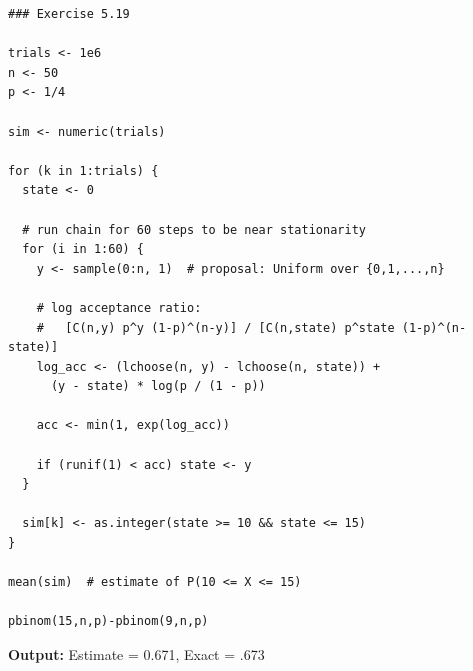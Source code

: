 \documentclass[hidelinks]{article}
\begin{document}
\begin{lstlisting}[caption={Metropolis-Hastings algorithm}]
### Exercise 5.19

trials <- 1e6
n <- 50
p <- 1/4

sim <- numeric(trials)

for (k in 1:trials) {
  state <- 0
  
  # run chain for 60 steps to be near stationarity
  for (i in 1:60) {
    y <- sample(0:n, 1)  # proposal: Uniform over {0,1,...,n}
    
    # log acceptance ratio:
    #   [C(n,y) p^y (1-p)^(n-y)] / [C(n,state) p^state (1-p)^(n-state)]
    log_acc <- (lchoose(n, y) - lchoose(n, state)) +
      (y - state) * log(p / (1 - p))
    
    acc <- min(1, exp(log_acc))
    
    if (runif(1) < acc) state <- y
  }
  
  sim[k] <- as.integer(state >= 10 && state <= 15)
}

mean(sim)  # estimate of P(10 <= X <= 15)

pbinom(15,n,p)-pbinom(9,n,p)
\end{lstlisting}

\noindent \textbf{Output:} Estimate = 0.671, Exact = .673
\end{document}
